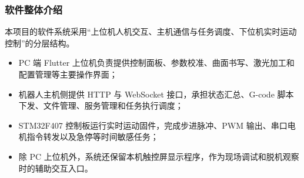 ﻿\documentclass[UTF8,zihao=-4,fontset=windows]{ctexart}
\begin{document}
\subsubsection{软件整体介绍}
本项目的软件系统采用“上位机人机交互、主机通信与任务调度、下位机实时运动控制”的分层结构。

\begin{itemize}
  \item PC 端 Flutter 上位机负责提供控制面板、参数校准、曲面书写、激光加工和配置管理等主要操作界面；
  \item 机器人主机侧提供 HTTP 与 WebSocket 接口，承担状态汇总、G-code 脚本下发、文件管理、服务管理和任务执行调度；
  \item STM32F407 控制板运行实时运动固件，完成步进脉冲、PWM 输出、串口电机指令转发以及急停等时间敏感任务；
  \item 除 PC 上位机外，系统还保留本机触控屏显示程序，作为现场调试和脱机观察时的辅助交互入口。
\end{itemize}
\end{document}
